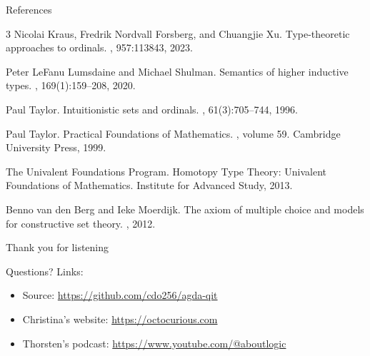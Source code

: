 \documentclass{beamer}
\begin{document}
\begin{frame}[allowframebreaks]{References}
\begin{thebibliography}{3}
  Nicolai Kraus, Fredrik Nordvall Forsberg, and Chuangjie Xu.
  \newblock Type-theoretic approaches to ordinals.
  , 957:113843, 2023.

  Peter LeFanu Lumsdaine and Michael Shulman.
  \newblock Semantics of higher inductive types.
  , 169(1):159--208, 2020.

  Paul Taylor.
  \newblock Intuitionistic sets and ordinals.
  , 61(3):705--744, 1996.

  Paul Taylor.
  \newblock Practical Foundations of Mathematics.
  , volume 59. Cambridge University Press, 1999.

  The Univalent Foundations Program.
  \newblock Homotopy Type Theory: Univalent Foundations of Mathematics.
  \newblock Institute for Advanced Study, 2013.

  Benno van den Berg and Ieke Moerdijk.
  \newblock The axiom of multiple choice and models for constructive set theory.
  , 2012.

  \end{thebibliography}
\end{frame}

\begin{frame}
  \centering
  \vfill
  {\LARGE Thank you for listening}

  \vspace{1em}

  Questions?
  \vspace{1em}
  Links:
  \begin{itemize}
    \item Source: \url{https://github.com/cdo256/agda-qit}
    \item Christina's website: \url{https://octocurious.com}
    \item Thorsten's podcast: \url{https://www.youtube.com/@aboutlogic}
  \end{itemize}
  \vfill
\end{frame}
\end{document}
